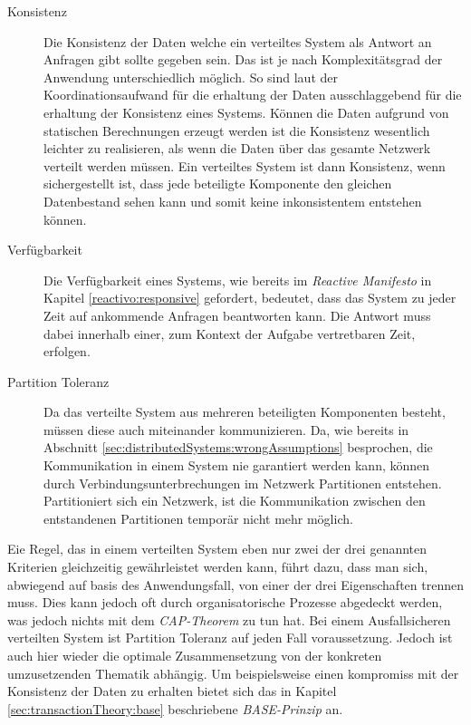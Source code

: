 \begin{description}
\item[Konsistenz]
Die Konsistenz der Daten welche ein verteiltes System als Antwort an Anfragen gibt sollte gegeben sein. Das ist je nach Komplexitätsgrad der Anwendung unterschiedlich möglich. So sind laut \cite{gilbertPerspectiveCAPTheorem2012} der Koordinationsaufwand für die erhaltung der Daten ausschlaggebend für die erhaltung der Konsistenz eines Systems. Können die Daten aufgrund von statischen Berechnungen erzeugt werden ist die Konsistenz wesentlich leichter zu realisieren, als wenn die Daten über das gesamte Netzwerk verteilt werden müssen. Ein verteiltes System ist dann Konsistenz, wenn sichergestellt ist, dass jede beteiligte Komponente den gleichen Datenbestand sehen kann und somit keine inkonsistentem entstehen können.   

\item[Verfügbarkeit]
Die Verfügbarkeit eines Systems, wie bereits im {\textit{Reactive Manifesto}} in Kapitel \ref{reactivo:responsive} gefordert, bedeutet, dass das System zu jeder Zeit auf ankommende Anfragen beantworten kann. Die Antwort muss dabei innerhalb einer, zum Kontext der Aufgabe vertretbaren Zeit, erfolgen.

\item[Partition Toleranz]
Da das verteilte System aus mehreren beteiligten Komponenten besteht, müssen diese auch miteinander kommunizieren. Da, wie bereits in Abschnitt \ref{sec:distributedSystems:wrongAssumptions} besprochen, die Kommunikation in einem System nie garantiert werden kann, können durch Verbindungsunterbrechungen im Netzwerk Partitionen entstehen. Partitioniert sich ein Netzwerk, ist die Kommunikation zwischen den entstandenen Partitionen temporär nicht mehr möglich.
\end{description}
Eie Regel, das in einem verteilten System eben nur zwei der drei genannten Kriterien gleichzeitig gewährleistet werden kann, führt dazu, dass man sich, abwiegend auf basis des Anwendungsfall, von einer der drei Eigenschaften trennen muss. Dies kann jedoch oft durch organisatorische Prozesse abgedeckt werden, was jedoch nichts mit dem \textit{CAP-Theorem} zu tun hat. Bei einem Ausfallsicheren verteilten System ist Partition Toleranz auf jeden Fall voraussetzung. Jedoch ist auch hier wieder die optimale Zusammensetzung von der konkreten umzusetzenden Thematik abhängig. Um beispielsweise einen kompromiss mit der Konsistenz der Daten zu erhalten bietet sich das in Kapitel \ref{sec:transactionTheory:base} beschriebene \textit{BASE-Prinzip} an.